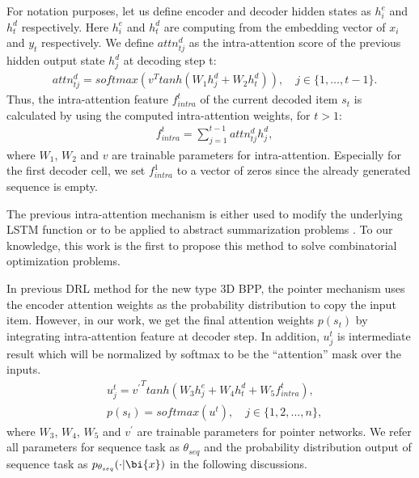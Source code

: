 For notation purposes, let us define encoder and decoder hidden states as $h_{i}^{e}$ and $h_{t}^{d}$ respectively. 
Here $h_{i}^{e}$ and $h_{t}^{d}$ are computing from the embedding vector of $x_{i}$ and $y_{t}$ respectively.
We define $attn_{tj}^{d}$ as the intra-attention score of the previous hidden output state $h_{j}^{d}$ at decoding step t:
\begin{eqnarray*}\label{1}
	&attn_{tj}^{d} = softmax(v^{T}tanh(W_{1}h_{j}^{d} + W_{2}h_{t}^{d})),\quad j \in \{1,\dots,t-1\}.
\end{eqnarray*}
Thus, the intra-attention feature $f_{intra}^{t}$ of the current decoded item $s_{t}$ is calculated by using the computed intra-attention weights, for $t > 1$: 
\begin{eqnarray*}\label{2}
	&f_{intra}^{t} = \sum_{j=1}^{t-1}{attn_{tj}^{d}h_{j}^{d}},	
\end{eqnarray*}
where $W_{1}$, $W_{2}$ and $v$ are trainable parameters for intra-attention. Especially for the first decoder cell, we set $f_{intra}^{1}$ to a vector of zeros since the already generated sequence is empty.

The previous intra-attention mechanism is either used to modify the underlying LSTM function \cite{cheng2016long} or to be applied to abstract summarization problems \cite{paulus2017deep}.
To our knowledge, this work is the first to propose this method to solve combinatorial optimization problems.

In previous DRL method for the new type 3D BPP, the pointer mechanism uses the encoder attention weights as the probability distribution to copy the input item. However, in our work, we get the final attention weights $p(s_{t})$ by integrating intra-attention feature at decoder step. In addition, $u_j^t$ is intermediate result which will be normalized by softmax to be the ``attention'' mask over the inputs. 
\begin{eqnarray*}\label{3}
	&u_{j}^{t} = {v^{'}}^{T}tanh(W_{3}h_{j}^{e} + W_{4}h_{t}^{d} + W_{5}f_{intra}^{t}) \nonumber, \\
	&p(s_{t}) = softmax(u^{t}), \quad j\in\{1,2,...,n\},	 %
\end{eqnarray*}
where $W_{3}$, $W_{4}$, $W_{5}$ and $v^{'}$ are trainable parameters for pointer networks.
We refer all parameters for sequence task as $\theta_{seq}$ and the probability distribution output of sequence task as $p_{\theta_{seq}}(\cdot|\bi{x})$ in the following discussions.

